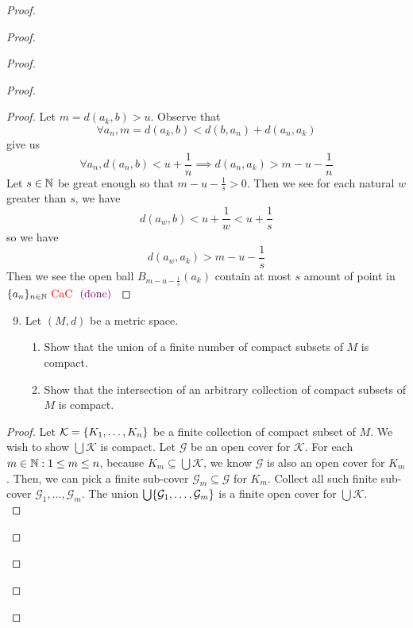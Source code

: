 \documentclass{report}
\begin{document}
\begin{proof}
\begin{proof}
\begin{proof}
\begin{proof}
\begin{proof}
Let $m=d(a_k,b)>u$. Observe that 
\begin{equation}
\forall a_n,m=d(a_k,b)<d(b,a_n)+d(a_n,a_k)
\end{equation}
give us
\begin{equation}
\forall a_n, d(a_n,b)<u+\frac{1}{n}\implies d(a_n,a_k)>m-u-\frac{1}{n}
\end{equation}
Let $s\in\mathbb{N}$ be great enough so that  $m-u-\frac{1}{s}>0$. Then we see for each natural $w$ greater than  $s$, we have
 \begin{equation}
d(a_w,b)<u+\frac{1}{w}<u+\frac{1}{s}
\end{equation}
so we have
\begin{equation}
d(a_w,a_k)>m-u-\frac{1}{s}
\end{equation}
Then we see the open ball $B_{m-u-\frac{1}{s}}(a_k)$ contain at most $s$ amount of point in  $\{ a_n \}_{n\in\mathbb{N}}\text{ \textcolor{red}{CaC} }\textcolor{violet}{\text{ (done) }}$
















\end{proof}
\begin{question}{}{}
\begin{enumerate}
    \setcounter{enumi}{8}
    \item Let \( (M, d) \) be a metric space.
    \begin{enumerate}
        \item Show that the union of a finite number of compact subsets of \( M \) is compact.
        \item Show that the intersection of an arbitrary collection of compact subsets of \( M \) is compact.
    \end{enumerate}
\end{enumerate}
\end{question}
\begin{proof}
  Let $\mathcal{K}=\{ K_1,\dots , K_n \}$ be a finite collection of compact subset of $M$. We wish to show $\bigcup  \mathcal{K}$ is compact. Let $\mathcal{G}$ be an open cover for $\mathcal{K}$. For each $m \in\mathbb{N}:1\leq m\leq n$, because $K_m\subseteq \bigcup \mathcal{K}$, we know $\mathcal{G}$ is also an open cover for $K_m$. Then, we can pick a finite sub-cover  $\mathcal{G}_m\subseteq \mathcal{G}$ for $K_m$. Collect all such finite sub-cover  $\mathcal{G}_1,\dots, \mathcal{G}_m$. The union $\bigcup \{ \mathcal{G}_1,\dots ,\mathcal{G}_m \}$ is a finite open cover for $\bigcup \mathcal{K} $.\\


\end{proof}
\end{proof}
\end{proof}
\end{proof}
\end{proof}
\end{document}
